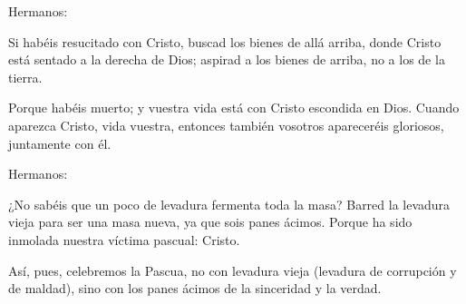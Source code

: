 
 


\begin{scripture}
Hermanos: 

Si habéis resucitado con Cristo, buscad los bienes de allá arriba, donde Cristo está sentado a la derecha de Dios; aspirad a los bienes de arriba, no a los de la tierra. 

Porque habéis muerto; y vuestra vida está con Cristo escondida en Dios. Cuando aparezca Cristo, vida vuestra, entonces también vosotros apareceréis gloriosos, juntamente con él.
\end{scripture}

\newpage


 


\begin{scripture}
Hermanos: 

¿No sabéis que un poco de levadura fermenta toda la masa? Barred la levadura vieja para ser una masa nueva, ya que sois panes ácimos. Porque ha sido inmolada nuestra víctima pascual: Cristo. 

Así, pues, celebremos la Pascua, no con levadura vieja (levadura de corrupción y de maldad), sino con los panes ácimos de la sinceridad y la verdad.
\end{scripture}


 



